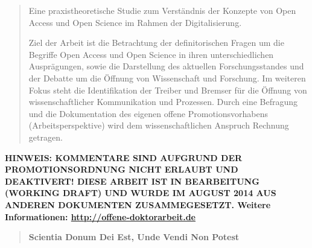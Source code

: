 \begin{abstract}Eine praxistheoretische Studie zum Verständnis der Konzepte von Open Access und Open Science im Rahmen der Digitalisierung.

Ziel der Arbeit ist die Betrachtung der definitorischen Fragen um die Begriffe Open Access und Open Science in ihren unterschiedlichen Ausprägungen, sowie die Darstellung des aktuellen Forschungsstandes und der Debatte um die Öffnung von Wissenschaft und Forschung. Im weiteren Fokus steht die Identifikation der Treiber und Bremser für die Öffnung von wissenschaftlicher Kommunikation und Prozessen. Durch eine Befragung und die Dokumentation des eigenen offene Promotionsvorhabens (Arbeitsperspektive) wird dem wissenschaftlichen Anspruch Rechnung getragen.
\end{abstract}

\textbf{HINWEIS: KOMMENTARE SIND AUFGRUND DER PROMOTIONSORDNUNG NICHT ERLAUBT UND DEAKTIVERT! DIESE ARBEIT IST IN BEARBEITUNG (WORKING DRAFT) UND WURDE IM AUGUST 2014 AUS ANDEREN DOKUMENTEN ZUSAMMEGESETZT.  Weitere Informationen: \href{http://offene-doktorarbeit.de}{http://offene-doktorarbeit.de}}

\begin{quote}
\textbf{Scientia Donum Dei Est, Unde Vendi Non Potest}
\end{quote}
